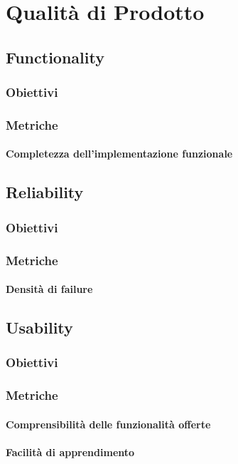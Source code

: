 \section{Qualità di Prodotto}
	\subsection{Functionality}
		\subsubsection{Obiettivi}
		\subsubsection{Metriche}
			\paragraph{Completezza dell'implementazione funzionale}

	\subsection{Reliability}
		\subsubsection{Obiettivi}
		\subsubsection{Metriche}
			\paragraph{Densità di failure}
			
	\subsection{Usability}
		\subsubsection{Obiettivi}
		\subsubsection{Metriche}
			\paragraph{Comprensibilità delle funzionalità offerte}
			\paragraph{Facilità di apprendimento}
			
